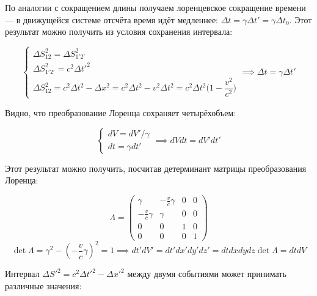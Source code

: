 \documentclass{article}
\begin{document}
По аналогии с сокращением длины получаем лоренцевское сокращение времени --- в движущейся системе отсчёта время идёт медленнее: $\Delta t=\gamma\Delta t'=\gamma\Delta t_0$. Этот результат можно получить из условия сохранения интервала:

\begin{equation*}
    \begin{cases}
    \Delta S_{12}^2=\Delta S_{1'2'}^2\\
    \Delta S_{1'2'}^2=c^2\Delta t'^2\\
    \Delta S_{12}^2=c^2\Delta t^2-\Delta x^2=c^2\Delta t^2-v^2\Delta t^2=c^2\Delta t^2\big(1-\dfrac{v^2}{c^2}\big)
    \end{cases}
    \implies \Delta t=\gamma\Delta t'
\end{equation*}

Видно, что преобразование Лоренца сохраняет четырёхобъем:

\begin{equation*}
    \begin{cases}
    dV=dV'/\gamma\\
    dt=\gamma dt'
    \end{cases}
    \implies dVdt=dV'dt'
\end{equation*}

Этот результат можно получить, посчитав детерминант матрицы преобразования Лоренца:

\begin{equation*}
    \Lambda =
    \begin{pmatrix}
        \gamma & -\frac{v}{c}\gamma & 0 & 0 \\
        -\frac{v}{c}\gamma & \gamma & 0 & 0 \\
        0 & 0 & 1 & 0 \\
        0 & 0 & 0 & 1
    \end{pmatrix}
\end{equation*}
\begin{equation*}
    \det \Lambda = \gamma^2-\left(-\frac{v}{c}\gamma\right)^2=1
    \implies dt'dV'=dt'dx'dy'dz'=dtdxdydz\det\Lambda=dtdV
\end{equation*}

Интервал $\Delta S'^2=c^2\Delta t'^2-\Delta x'^2$ между двумя событиями может принимать различные значения:
\end{document}
